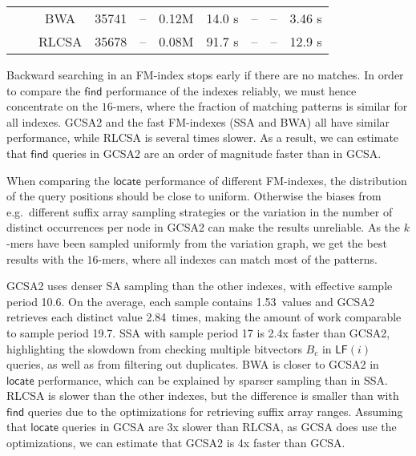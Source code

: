 \documentclass[twoside,leqno,twocolumn]{article}
\newcommand{\LF}{\ensuremath{\mathsf{LF}}}
\newcommand{\find}{\ensuremath{\mathsf{find}}}
\newcommand{\locate}{\ensuremath{\mathsf{locate}}}
\newcommand{\parent}{\ensuremath{\mathsf{parent}}}
\newcommand{\countq}{\ensuremath{\mathsf{count}}}
\newcommand{\kmer}[1]{$#1$\nobreakdash-mer}
\newcommand{\orderk}[1]{order\nobreakdash-$#1$}
\begin{document}
\begin{table*}[t]
\begin{center}
\begin{tabular}{cc|cccc|cccc}
     &        & BWA   &  35741 &    -- & 0.12M & 14.0 \textmu{}s &              -- &              -- & 3.46 \textmu{}s \\
     &        & RLCSA &  35678 &    -- & 0.08M & 91.7 \textmu{}s &              -- &              -- & 12.9 \textmu{}s \\
\hline
\end{tabular}
\caption{Query benchmarks using an \orderk{128} GCSA2 and various FM\nobreakdash-indexes. Pattern length; number of patterns; index type; number matching patterns, matching nodes, and distinct occurrences; average time for $[sp, ep] = \find(X)$, $\parent(sp, ep)$, and $\countq(sp, ep)$ queries in microseconds; and average time per value for $\locate(sp, ep)$ queries in microseconds.}\label{table:benchmark}
\end{center}
\end{table*}

Backward searching in an FM-index stops early if there are no matches. In order to compare the $\find$ performance of the indexes reliably, we must hence concentrate on the \kmer{16}s, where the fraction of matching patterns is similar for all indexes. GCSA2 and the fast FM-indexes (SSA and BWA) all have similar performance, while RLCSA is several times slower. As a result, we can estimate that $\find$ queries in GCSA2 are an order of magnitude faster than in GCSA.

When comparing the $\locate$ performance of different FM-indexes, the distribution of the query positions should be close to uniform. Otherwise the biases from e.g.~different suffix array sampling strategies or the variation in the number of distinct occurrences per node in GCSA2 can make the results unreliable. As the \kmer{k}s have been sampled uniformly from the variation graph, we get the best results with the \kmer{16}s, where all indexes can match most of the patterns.

GCSA2 uses denser SA sampling than the other indexes, with effective sample period 10.6. On the average, each sample contains 1.53~values and GCSA2 retrieves each distinct value 2.84~times, making the amount of work comparable to sample period 19.7. SSA with sample period 17 is 2.4x faster than GCSA2, highlighting the slowdown from checking multiple bitvectors $B_{c}$ in $\LF(i)$ queries, as well as from filtering out duplicates. BWA is closer to GCSA2 in $\locate$ performance, which can be explained by sparser sampling than in SSA. RLCSA is slower than the other indexes, but the difference is smaller than with $\find$ queries due to the optimizations for retrieving suffix array ranges. Assuming that $\locate$ queries in GCSA are 3x slower than RLCSA, as GCSA does use the optimizations, we can estimate that GCSA2 is 4x faster than GCSA.
\end{document}
